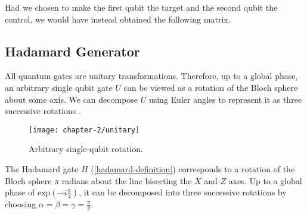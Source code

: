 Had we chosen to make the first qubit the target and the second qubit the control, we would have instead obtained the following matrix.


\subsection{Hadamard Generator}

All quantum gates are unitary transformations. Therefore, up to a global phase, an arbitrary single qubit gate $U$ can be viewed as a rotation of the Bloch sphere about some axis. We can decompose $U$ using Euler angles to represent it as three successive rotations \cite{Wetering2020}.

\begin{figure}[H]
    \centering
    \texttt{[image: chapter-2/unitary]}
    \caption{Arbitrary single-qubit rotation.}
\end{figure}

The Hadamard gate $H$ (\ref{hadamard-definition}) corresponds to a rotation of the Bloch sphere $\pi$ radians about the line bisecting the $X$ and $Z$ axes. Up to a global phase of $\text{exp} \left(-i \frac{\pi}{4} \right)$, it can be decomposed into three successive rotations by choosing $\alpha = \beta = \gamma = \frac{\pi}{2}$. 

